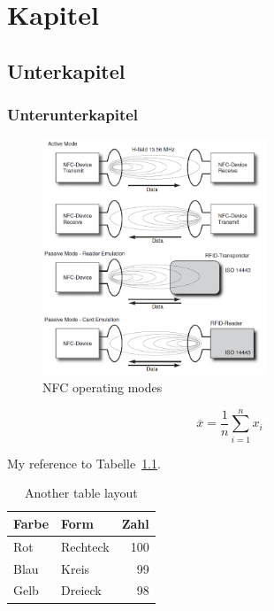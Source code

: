\chapter{Kapitel}

\section{Unterkapitel}

\subsection{Unterunterkapitel}

\lipsum[2]

\begin{figure}[h!]
	\centering
		\includegraphics[width=0.6\textwidth]{images/nfc_communication}
		\vspace*{0pt}
	\caption[NFC operating modes]{NFC operating modes \citep[p.~58]{Finkenzeller.2010}}
	\label{fig:nfc_communication}
\end{figure}

\lipsum[2]

\begin{equation}
	\overline{x} = \frac 1n \sum^n_{i=1} x_i
\end{equation}

\lipsum[2] 

My reference to Tabelle~\ref{tbl:beispieltabelle1}.

\begin{table}
	\centering
	
		\begin{tabular}{|l|l|r|}
		\hline
			\textbf{Farbe} & \textbf{Form} & \textbf{Zahl} \\
		\hline
			Rot & Rechteck & 100 \\
		\hline
			Blau & Kreis & 99 \\
		\hline
			Gelb & Dreieck & 98 \\
		\hline
		\end{tabular}
		\caption{Another table layout}
	    \label{tbl:beispieltabelle1}
	
\end{table}

